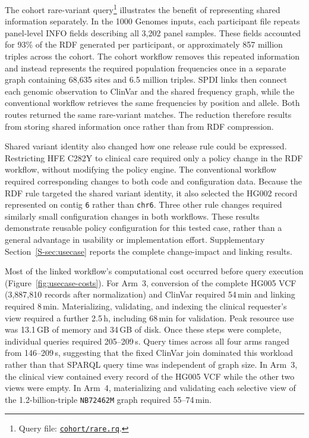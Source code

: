 \documentclass[pdflatex,sn-mathphys-num]{sn-jnl}
\begin{document}
The cohort rare-variant query\footnote{Query file: \href{https://github.com/ecrum19/vcf-rdfizer-testing/blob/main/benchmarks/use_case/acmg/cohort/rare.rq}{\texttt{cohort/rare.rq}}.} illustrates the benefit of representing shared information separately.
In the 1000 Genomes inputs, each participant file repeats panel-level INFO fields describing all 3,202 panel samples.
These fields accounted for 93\% of the RDF generated per participant, or approximately 857 million triples across the cohort.
The cohort workflow removes this repeated information and instead represents the required population frequencies once in a separate graph containing 68,635 sites and 6.5 million triples.
SPDI links then connect each genomic observation to ClinVar and the shared frequency graph, while the conventional workflow retrieves the same frequencies by position and allele.
Both routes returned the same rare-variant matches.
The reduction therefore results from storing shared information once rather than from RDF compression.

Shared variant identity also changed how one release rule could be expressed.
Restricting HFE C282Y to clinical care required only a policy change in the RDF workflow, without modifying the policy engine.
The conventional workflow required corresponding changes to both code and configuration data.
Because the RDF rule targeted the shared variant identity, it also selected the HG002 record represented on contig \texttt{6} rather than \texttt{chr6}.
Three other rule changes required similarly small configuration changes in both workflows.
These results demonstrate reusable policy configuration for this tested case, rather than a general advantage in usability or implementation effort.
Supplementary Section~\ref{S-sec:usecase} reports the complete change-impact and linking results.

Most of the linked workflow's computational cost occurred before query execution (Figure~\ref{fig:usecase-costs}).
For Arm~3, conversion of the complete HG005 VCF (3,887,810 records after normalization) and ClinVar required 54\,min and linking required 8\,min.
Materializing, validating, and indexing the clinical requester's view required a further 2.5\,h, including 68\,min for validation.
Peak resource use was 13.1\,GB of memory and 34\,GB of disk.
Once these steps were complete, individual queries required 205--209\,s.
Query times across all four arms ranged from 146--209\,s, suggesting that the fixed ClinVar join dominated this workload rather than that SPARQL query time was independent of graph size.
In Arm~3, the clinical view contained every record of the HG005 VCF while the other two views were empty.
In Arm~4, materializing and validating each selective view of the 1.2-billion-triple \texttt{NB72462M} graph required 55--74\,min.
\end{document}
